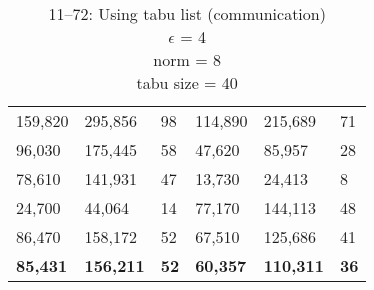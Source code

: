 \begin{table}
\begin{tabular}{R{1.5cm}|R{1.8cm}|R{1cm}||R{1.5cm}|R{1.8cm}|R{1cm}}
159,820 & 295,856 & 98 & 114,890 & 215,689 & 71 \\   
96,030 & 175,445 & 58 & 47,620 & 85,957 & 28 \\   
78,610 & 141,931 & 47 & 13,730 & 24,413 & 8 \\   
24,700 & 44,064 & 14 & 77,170 & 144,113 & 48 \\   
86,470 & 158,172 & 52 & 67,510 & 125,686 & 41 \\ 
\hline  
\textbf{85,431} & \textbf{156,211} & \textbf{52} & \textbf{60,357} & \textbf{110,311} & \textbf{36}\\
\hline
\end{tabular}
\caption{\gr{} 11--72: Using tabu list (communication)\\ $\epsilon$ = 4\\norm = 8\\tabu size = 40}\label{subtab:gr11_tabu_comm}
\end{table}